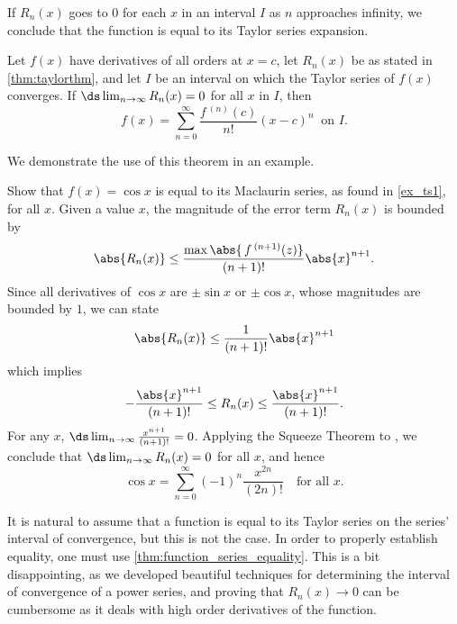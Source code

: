 If $R_n(x)$ goes to 0 for each $x$ in an interval $I$ as $n$ approaches infinity, we conclude that the function is equal to its Taylor series expansion.

\begin{theorem}\label{thm:function_series_equality}
Let $f(x)$ have derivatives of all orders at $x=c$, let $R_n(x)$ be as stated in \autoref{thm:taylorthm}, and let $I$ be an interval on which the Taylor series of $f(x)$ converges. 
If $\ds\lim_{n\to\infty} R_n(x) = 0$ for all $x$ in $I$, then 
\[f(x) = \sum_{n=0}^\infty \frac{f\,^{(n)}(c)}{n!}(x-c)^n\ \text{ on $I$.}\]
\end{theorem}

We demonstrate the use of this theorem in an example.

\begin{example}\label{ex_ts3}
Show that $f(x) = \cos x$ is equal to its Maclaurin series, as found in \autoref{ex_ts1}, for all $x$.
\solution
Given a value $x$, the magnitude of the error term $R_n(x)$ is bounded by
\[\abs{R_n(x)}\leq \frac{\max\abs{\,f\,^{(n+1)}(z)}}{(n+1)!}\abs{x}^{n+1}.\]
Since all derivatives of $\cos x$ are $\pm \sin x$ or $\pm\cos x$, whose magnitudes are bounded by $1$, we can state
\[\abs{R_n(x)}\leq \frac{1}{(n+1)!}\abs{x}^{n+1}\]
which implies
\begin{equation}
 -\frac{\abs{x}^{n+1}}{(n+1)!} \leq R_n(x) \leq\frac{\abs{x}^{n+1}}{(n+1)!}.\label{eq:coseqtaylor}
\end{equation}
For any $x$, $\ds\lim_{n\to\infty} \frac{x^{n+1}}{(n+1)!} = 0$. Applying the Squeeze Theorem to , we conclude that $\ds \lim_{n\to\infty} R_n(x) = 0$ for all $x$, and hence
\[\cos x = \sum_{n=0}^\infty (-1)^{n}\frac{x^{2n}}{(2n)!}\quad \text{for all $x$}.\]
\end{example}

It is natural to assume that a function is  equal to its Taylor series on the series' interval of convergence, but this is not the case. In order to properly establish equality, one must use \autoref{thm:function_series_equality}. This is a bit disappointing, as we developed beautiful techniques for determining the interval of convergence of a power series, and proving that $R_n(x)\to 0$ can be cumbersome as it deals with high order derivatives of the function.

